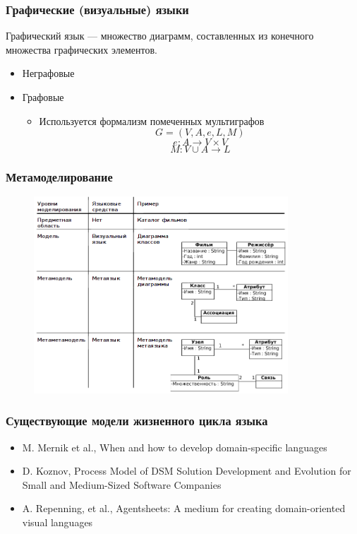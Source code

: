 \documentclass[14pt]{beamer}
\begin{document}
\begin{frame}
    \frametitle{Графические (визуальные) языки}
    Графический язык --- множество диаграмм, составленных из конечного множества 
    графических элементов.
    \begin{itemize}
        \item Неграфовые
        \item Графовые
        \begin{itemize}
            \item Используется формализм помеченных мультиграфов
                $$G = (V, A, e, L, M)$$
                $$e: A \rightarrow V \times V$$
                $$M: V \cup A \rightarrow L$$
        \end{itemize}
    \end{itemize}
\end{frame}

\begin{frame}
    \frametitle{Метамоделирование}
    \vspace*{-0.35cm}
    \begin{figure}
    	\begin{center}
    		\includegraphics[width=0.85\textwidth]{images/presentation/metalevels.png}
    	\end{center}
    \end{figure}
\end{frame}

\begin{frame}
    \frametitle{Существующие модели жизненного цикла языка}
    \begin{itemize}
        \item M. Mernik et al., When and how to develop domain-specific languages
        \item D. Koznov, Process Model of DSM Solution Development and Evolution 
            for Small and Medium-Sized Software Companies
        \item A. Repenning, et al., Agentsheets: A medium for creating 
            domain-oriented visual languages
    \end{itemize}
\end{frame}
\end{document}
